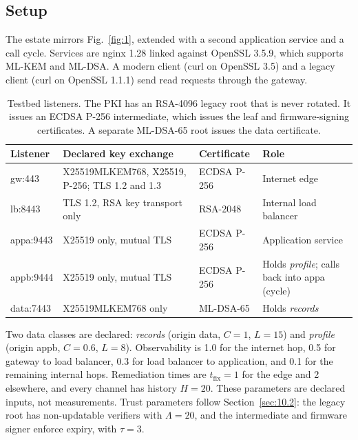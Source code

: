 \documentclass[conference]{IEEEtran}
\newcommand{\tfix}{t_{\mathrm{fix}}}
\begin{document}
\subsection{Setup}\label{sec:13.1}

The estate mirrors Fig.~\ref{fig:1}, extended with a second application service and a call cycle. Services are nginx 1.28 linked against OpenSSL 3.5.9, which supports ML-KEM and ML-DSA. A modern client (curl on OpenSSL 3.5) and a legacy client (curl on OpenSSL 1.1.1) send read requests through the gateway.
\begin{table}[!t]
\centering\footnotesize
\caption{Testbed listeners. The PKI has an RSA-4096 legacy root that is never rotated. It issues an ECDSA P-256 intermediate, which issues the leaf and firmware-signing certificates. A separate ML-DSA-65 root issues the data certificate.}\label{tab:4}
\begin{tabularx}{\linewidth}{>{\raggedright\arraybackslash}X>{\raggedright\arraybackslash}X>{\raggedright\arraybackslash}X>{\raggedright\arraybackslash}X}
\toprule
\textbf{Listener} & \textbf{Declared key exchange} & \textbf{Certificate} & \textbf{Role} \\ \midrule
gw:443 & X25519MLKEM768, X25519, P-256; TLS 1.2 and 1.3 & ECDSA P-256 & Internet edge \\
lb:8443 & TLS 1.2, RSA key transport only & RSA-2048 & Internal load balancer \\
appa:9443 & X25519 only, mutual TLS & ECDSA P-256 & Application service \\
appb:9444 & X25519 only, mutual TLS & ECDSA P-256 & Holds \emph{profile}; calls back into appa (cycle) \\
data:7443 & X25519MLKEM768 only & ML-DSA-65 & Holds \emph{records} \\
\bottomrule
\end{tabularx}
\end{table}

Two data classes are declared: \emph{records} (origin data, $C = 1$, $L = 15$) and \emph{profile} (origin appb, $C = 0.6$, $L = 8$). Observability is 1.0 for the internet hop, 0.5 for gateway to load balancer, 0.3 for load balancer to application, and 0.1 for the remaining internal hops. Remediation times are $\tfix = 1$ for the edge and 2 elsewhere, and every channel has history $H = 20$. These parameters are declared inputs, not measurements. Trust parameters follow Section~\ref{sec:10.2}: the legacy root has non-updatable verifiers with $\Lambda = 20$, and the intermediate and firmware signer enforce expiry, with $\tau = 3$.
\end{document}
